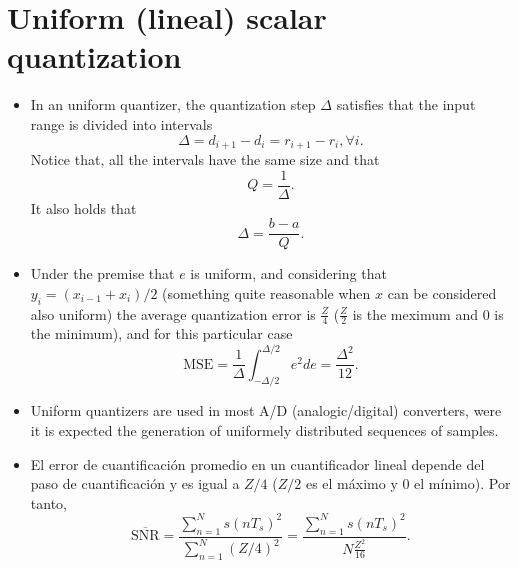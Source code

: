 \section{Uniform (lineal) scalar quantization}
\begin{itemize}

\item
  In an uniform quantizer, the quantization step \(\Delta\) satisfies
  that the input range is divided into intervals
  \begin{equation}
    \Delta=d_{i+1}-d_i=r_{i+1}-r_i, \forall i.
  \end{equation}
  Notice that, all the intervals have the same size and that
  \begin{equation}
    Q=\frac{1}{\Delta}.
  \end{equation}
  It also holds that
  \begin{equation}
    \Delta=\frac{b-a}{Q}.
  \end{equation}

\item
  Under the premise that $e$ is uniform, and considering that
  $y_i=(x_{i-1}+x_i)/2$ (something quite reasonable when $x$ can be
  considered also uniform) the average quantization error is
  $\frac{Z}{4}$ ($\frac{Z}{2}$ is the meximum and $0$ is the minimum),
  and for this particular case
  \begin{equation}
    \text{MSE} =
    \frac{1}{\Delta}\int_{-\Delta/2}^{\Delta/2}e^2de=\frac{\Delta^2}{12}.
  \end{equation}


  
\item
  Uniform quantizers are used in most A/D (analogic/digital)
  converters, were it is expected the generation of uniformely
  distributed sequences of samples.

\item El error de cuantificaci\'on promedio en un cuantificador lineal
  depende del paso de cuantificaci\'on y es igual a $Z/4$ ($Z/2$ es el
  m\'aximo y $0$ el m\'inimo). Por tanto,
  \begin{equation*}
    \overline{\text{SNR}}=\frac{\displaystyle\sum_{n=1}^N
    s(nT_s)^2}{\displaystyle\sum_{n=1}^N (Z/4)^2} =
    \frac{\displaystyle\sum_{n=1}^N
      s(nT_s)^2}{N\displaystyle\frac{Z^2}{16}}.
  \end{equation*}


\end{itemize}
